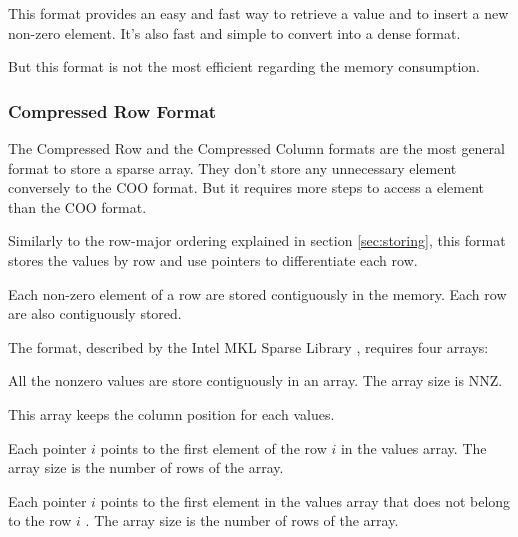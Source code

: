 This format provides an easy and fast way to retrieve a value and to insert a new non-zero element. It's also fast and simple to convert into a dense format.

But this format is not the most efficient regarding the memory consumption.

\subsubsection{Compressed Row Format}

The Compressed Row and the Compressed Column formats are the most general format to store a sparse array. They don't store any unnecessary element conversely to the COO format. But it requires more steps to access a element than the COO format. 

Similarly to the row-major ordering explained in section \ref{sec:storing}, this format stores the values by row and use pointers to differentiate each row.

Each non-zero element of a row are stored contiguously in the memory. Each row are also contiguously stored.

The format, described by the Intel MKL Sparse Library \cite{mklformat}, requires four arrays:
\begin{description}[leftmargin=!,labelwidth=\widthof{\bfseries Beginning of row pointers}]
	\item [Values] All the nonzero values are store contiguously in an array. The array size is {NNZ}.
	\item [Column pointers] This array keeps the column position for each values.
	\item [Beginning of row pointers] Each pointer $i$ points to the first element of the row $i$ in the values array. The array size is the number of rows of the array.
	\item [End of row pointers]  Each pointer $i$ points to the first element in the values array that does not belong to the row $i$ . The array size is the number of rows of the array.
\end{description}

